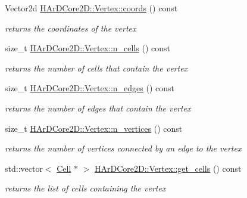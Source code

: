 \begin{DoxyCompactItemize}
\mbox{\label{group__Mesh_gade92964c93627c034b021c1d23075a79}} 
Vector2d \hyperlink{group__Mesh_gade92964c93627c034b021c1d23075a79}{H\+Ar\+D\+Core2\+D\+::\+Vertex\+::coords} () const
\begin{DoxyCompactList}\small\item\em returns the coordinates of the vertex \end{DoxyCompactList}\item 
\mbox{\label{group__Mesh_gaae4e6a646ff79f705428c9063736aee1}} 
size\+\_\+t \hyperlink{group__Mesh_gaae4e6a646ff79f705428c9063736aee1}{H\+Ar\+D\+Core2\+D\+::\+Vertex\+::n\+\_\+cells} () const
\begin{DoxyCompactList}\small\item\em returns the number of cells that contain the vertex \end{DoxyCompactList}\item 
\mbox{\label{group__Mesh_ga1d6d5233c4f95c862387b5961fef5a22}} 
size\+\_\+t \hyperlink{group__Mesh_ga1d6d5233c4f95c862387b5961fef5a22}{H\+Ar\+D\+Core2\+D\+::\+Vertex\+::n\+\_\+edges} () const
\begin{DoxyCompactList}\small\item\em returns the number of edges that contain the vertex \end{DoxyCompactList}\item 
\mbox{\label{group__Mesh_ga64033a69394a8fa757ca097407ab5e0a}} 
size\+\_\+t \hyperlink{group__Mesh_ga64033a69394a8fa757ca097407ab5e0a}{H\+Ar\+D\+Core2\+D\+::\+Vertex\+::n\+\_\+vertices} () const
\begin{DoxyCompactList}\small\item\em returns the number of vertices connected by an edge to the vertex \end{DoxyCompactList}\item 
\mbox{\label{group__Mesh_gaff000e01e8c4bd44162ae8b526950d31}} 
std\+::vector$<$ \hyperlink{classHArDCore2D_1_1Cell}{Cell} $\ast$ $>$ \hyperlink{group__Mesh_gaff000e01e8c4bd44162ae8b526950d31}{H\+Ar\+D\+Core2\+D\+::\+Vertex\+::get\+\_\+cells} () const
\begin{DoxyCompactList}\small\item\em returns the list of cells containing the vertex \end{DoxyCompactList}\item 

\end{DoxyCompactItemize}
